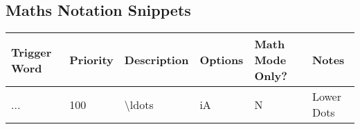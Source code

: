 \documentclass[11pt]{article}
\theoremstyle{plain}%
\theoremstyle{definition}
\theoremstyle{remark}
\theoremstyle{breakthm}
\theoremstyle{breakdefn}
\theoremstyle{breakrem}
\begin{document}
	\subsection{Maths Notation Snippets}	
	\begin{center}
	\begin{table}[htbp]
		\begin{tabular}{||m{2cm}|m{1.5cm}|m{3cm}|m{1.5cm}|m{2.5cm}|m{4cm}||}
		\hline
		\textbf{Trigger Word} & \textbf{Priority} & \textbf{Description} & \textbf{Options} & \textbf{Math Mode Only?} & \textbf{Notes} \\
		\hline
		\hline
		... & 100 & \textbackslash ldots & iA & N & Lower Dots \\ \hline 
		\end{tabular}
	\end{table}
	\end{center}
\end{document}
